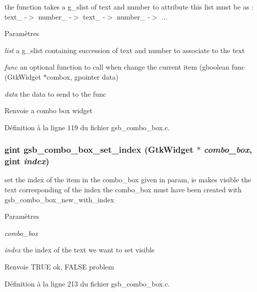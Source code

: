 the function takes a g\_\-slist of text and number to attribute this list must be as : text\_ -\/$>$ number\_ -\/$>$ text\_ -\/$>$ number\_ -\/$>$ ...


\begin{DoxyParams}{Paramètres}
\item[{\em list}]a g\_\-slist containing succession of text and number to associate to the text \item[{\em func}]an optional function to call when change the current item (gboolean func (GtkWidget $\ast$combox, gpointer data) \item[{\em data}]the data to send to the func\end{DoxyParams}
\begin{DoxyReturn}{Renvoie}
a combo box widget 
\end{DoxyReturn}


Définition à la ligne 119 du fichier gsb\_\-combo\_\-box.c.

\subsubsection[{gsb\_\-combo\_\-box\_\-set\_\-index}]{\setlength{\rightskip}{0pt plus 5cm}gint gsb\_\-combo\_\-box\_\-set\_\-index (GtkWidget $\ast$ {\em combo\_\-box}, \/  gint {\em index})}\label{gsb__combo__box_8h_a8d9cde44f97483d1e2ebe3c6c65f5570}
set the index of the item in the combo\_\-box given in param, ie makes visible the text corresponding of the index the combo\_\-box must have been created with gsb\_\-combo\_\-box\_\-new\_\-with\_\-index


\begin{DoxyParams}{Paramètres}
\item[{\em combo\_\-box}]\item[{\em index}]the index of the text we want to set visible\end{DoxyParams}
\begin{DoxyReturn}{Renvoie}
TRUE ok, FALSE problem 
\end{DoxyReturn}


Définition à la ligne 213 du fichier gsb\_\-combo\_\-box.c.

